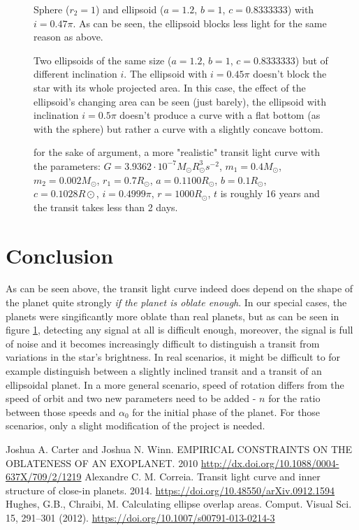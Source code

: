 \documentclass[10pt]{article}
\numberwithin{equation}{subsection}
\begin{document}
\begin{figure}[H]
  \centering
  
  \caption{Sphere ($r_2=1$) and ellipsoid ($a=1.2$, $b=1$, $c=0.8333333$) with $i=0.47\pi$.
  As can be seen, the ellipsoid blocks less light for the same reason as above.}
\end{figure}
\begin{figure}[H]
  \centering
  
  \caption{Two ellipsoids of the same size ($a=1.2$, $b=1$, $c=0.8333333$) but of different
  inclination $i$. The ellipsoid with $i=0.45\pi$ doesn't block the star with its whole
  projected area. In this case, the effect of the ellipsoid's changing area can be seen
  (just barely), the ellipsoid with inclination $i=0.5\pi$ doesn't produce a curve
  with a flat bottom (as with the sphere) but rather a curve with a slightly concave
  bottom.}
\end{figure}
\begin{figure}[H]
  \centering
  
  \caption{for the sake of argument, a more "realistic" transit light curve with the parameters:
  $G = 3.9362\cdot 10^{-7}M_\odot R^3_\odot s^{-2}$, $m_1 = 0.4M_\odot$, $m_2 = 0.002M_\odot$, $r_1 = 0.7R_\odot$, $a = 0.1100R_\odot$, $b = 0.1R_\odot$, $c = 0.1028R\odot$, $i = 0.4999\pi$, $r = 1000R_\odot$,
  $t$ is roughly 16 years and the transit takes less than 2 days.}
  \label{fig:6}
\end{figure}
\section{Conclusion}
As can be seen above, the transit light curve indeed does depend on the shape of the planet
quite strongly \emph{if the planet is oblate enough}. In our special cases, the planets
were singificantly more oblate than real planets, but as can be seen in figure \ref{fig:6},
detecting any signal at all is difficult enough, moreover, the signal is full of noise
and it becomes increasingly difficult to distinguish a transit from variations in the star's
brightness. In real scenarios, it might be difficult to for example distinguish between
a slightly inclined transit and a transit of an ellipsoidal planet. In a more general
scenario, speed of rotation differs from the speed of orbit and two new parameters
need to be added - $n$ for the ratio between those speeds and $\alpha_0$ for the
initial phase of the planet. For those scenarios,
only a slight modification of the project is needed.
\begin{thebibliography}{5}
   Joshua A. Carter and Joshua N. Winn. EMPIRICAL CONSTRAINTS ON THE OBLATENESS OF AN EXOPLANET. 2010 \url{http://dx.doi.org/10.1088/0004-637X/709/2/1219}
   Alexandre C. M. Correia. Transit light curve and inner structure of close-in planets. 2014. \url{https://doi.org/10.48550/arXiv.0912.1594}
   Hughes, G.B., Chraibi, M. Calculating ellipse overlap areas. Comput. Visual Sci. 15, 291–301 (2012). \url{https://doi.org/10.1007/s00791-013-0214-3}
\end{thebibliography}
\end{document}
